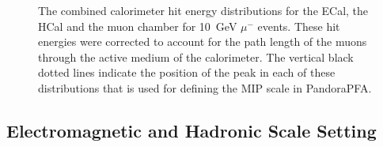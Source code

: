 \begin{figure}[h!]
\caption[The combined calorimeter hit energy distributions for \protect{} the ECal, \protect{} the HCal and \protect{} the muon chamber for 10~GeV $\mu^{-}$ events.  These hit energies were corrected to account for the path length of the muons through the active medium of the calorimeter.  The vertical black dotted lines indicate the position of the peak in each of these distributions that is used for defining the MIP scale in PandoraPFA.]{The combined calorimeter hit energy distributions for \protect{} the ECal, \protect{} the HCal and \protect{} the muon chamber for 10~GeV $\mu^{-}$ events.  These hit energies were corrected to account for the path length of the muons through the active medium of the calorimeter.  The vertical black dotted lines indicate the position of the peak in each of these distributions that is used for defining the MIP scale in PandoraPFA.}
\label{fig:pandoramip}
\end{figure}


\subsection{Electromagnetic and Hadronic Scale Setting}
\label{sec:scalesetting}


